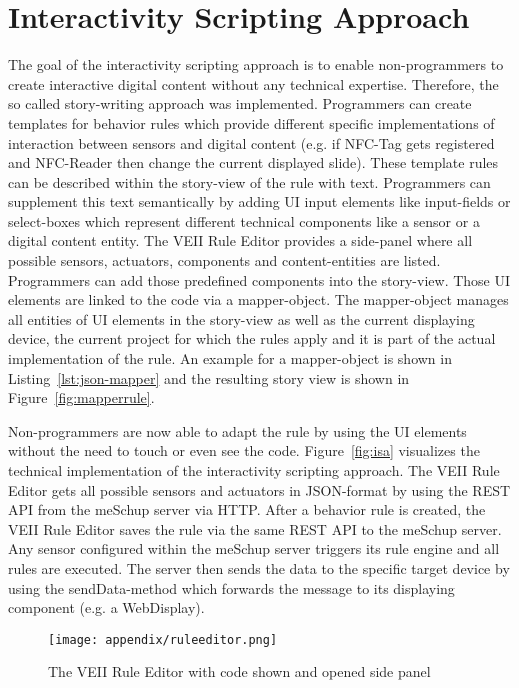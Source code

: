 \newpage

\section{Interactivity Scripting Approach}
\label{ISA}
The goal of the interactivity scripting approach is to enable non-programmers to create interactive digital content without any technical expertise. Therefore, the so called story-writing approach was implemented. Programmers can create templates for behavior rules which provide different specific implementations of interaction between sensors and digital content (e.g. if NFC-Tag gets registered and NFC-Reader then change the current displayed slide). These template rules can be described within the story-view of the rule with text. Programmers can supplement this text semantically by adding UI input elements like input-fields or select-boxes which represent different technical components like a sensor or a digital content entity. The VEII Rule Editor provides a side-panel where all possible sensors, actuators, components and content-entities are listed. Programmers can add those predefined components into the story-view. Those UI elements are linked to the code via a mapper-object. The mapper-object manages all entities of UI elements in the story-view as well as the current displaying device, the current project for which the rules apply and it is part of the actual implementation of the rule. An example for a mapper-object is shown in Listing~\ref{lst:json-mapper} and the resulting story view is shown in Figure~\ref{fig:mapperrule}.

Non-programmers are now able to adapt the rule by using the UI elements without the need to touch or even see the code.  
Figure~\ref{fig:isa} visualizes the technical implementation of the interactivity scripting approach. The VEII Rule Editor gets all possible sensors and actuators in JSON-format by using the REST API from the meSchup server via HTTP. After a behavior rule is created, the VEII Rule Editor saves the rule via the same REST API to the meSchup server. Any sensor configured within the meSchup server triggers its rule engine and all rules are executed. The server then sends the data to the specific target device by using the sendData-method which forwards the message to its displaying component (e.g. a WebDisplay).

\begin{figure}[H]
  \begin{center}
    \texttt{[image: appendix/ruleeditor.png]}
    \caption{The VEII Rule Editor with code shown and opened side panel}
    \label{fig:ruleeditor}
  \end{center}
\end{figure}


